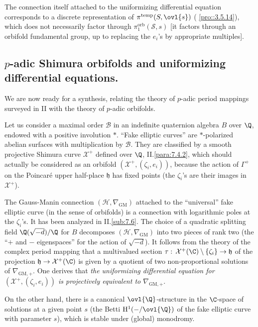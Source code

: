  
 The connection itself attached to the
uniformizing differential equation corresponds to a discrete
representation of $\pi^{\mathrm{temp}}(S,\ovl{s})$ (\cf
\ref{pro::3.5.14}), which 
does not necessarily factor through $\pi_1^{\mathrm{orb}}(\mathcal{S},s) $ [it
factors through an orbifold fundamental group, up to replacing the
$e_i$'s by appropriate multiples].

 
\subsection{$p$-adic Shimura orbifolds and uniformizing differential
  equations.}\label{sub::4.7}

\begin{para}\label{para::4.7.1} We are now ready for a synthesis, relating the
 theory of $p$-adic period mappings surveyed in II with the 
theory of $p$-adic orbifolds. 

Let us consider a maximal order
$\mathcal{B}$ in an indefinite quaternion algebra
$B$ over
$\Q$, endowed with a positive involution $\ast$. ``Fake elliptic
 curves'' are $\ast$-polarized abelian surfaces with multiplication by
$\mathcal{B}$. They are classified by a smooth projective Shimura curve
$\mathcal{X}^+$ defined over $\Q$, \cf
 II.\ref{para:7.4.2}, which should actually be considered as an orbifold 
 $(\mathcal{X}^+, (\zeta_i,e_i))$, because the action of $\Gamma^+$ on
the Poincar\'e upper half-place $\mathfrak{h}$ has fixed points (the
$\zeta_i$'s are their images in $\mathcal{X}^+$).

 The Gauss-Manin connection $(\mathcal{H}, \nabla_{\mathrm{GM}})$
 attached to the 
 ``universal'' fake elliptic curve (in the sense of 
 orbifolds) is a connection with logarithmic poles at the $\zeta_i$'s. It
 has been analyzed in  II.\ref{sub:7.6}. The choice 
 of a quadratic splitting field
 $\Q(\sqrt{-d})/\Q$ for $B$ decomposes $(\mathcal{H},
 \nabla_{\mathrm{GM}})$ into 
 two pieces of rank two (the ``$+$ and $-$ 
 eigenspaces'' for the action of $\sqrt{-d}$).  It follows from the
 theory of the complex period mapping that a multivalued 
 section $\tau :\,\mathcal{X}^+(\C)\setminus 
 \{\zeta_i\}\to \mathfrak{h}$ of the projection $\mathfrak{h}\to
 \mathcal{X}^+(\C)$ is given by a quotient of two non-proportional 
solutions of $\nabla_{\mathrm{GM},+}$. One derives that {\it the uniformizing
 differential equation for $(\mathcal{X}^+,
(\zeta_i,e_i))$ is projectively equivalent to $\nabla_{\mathrm{GM},+}$}.

On the other hand, there is a canonical $\ovl{\Q}$-structure in
the $\C$-space of solutions at a given point $s$ (the Betti $\mathrm{H}^1( -
 /\ovl{\Q})$ of the fake elliptic curve with parameter $s$), which is
stable under (global) monodromy.
\end{para}
 
